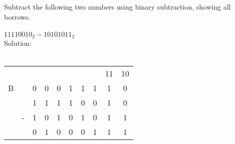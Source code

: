 Subtract the following two numbers using binary subtraction, showing all borrows. \\
\\
$11110010_2 - 10101011_2$\\

Solution: \\
\\
\begin{tabular}{cccccccccc}
    &   &   &   &   &   &   &   & 11& 10\\
  B &   & 0 & 0 & 0 & 1 & 1 & 1 & 1 & 0 \\
    &   & 1 & 1 & 1 & 1 & 0 & 0 & 1 & 0 \\
    & - & 1 & 0 & 1 & 0 & 1 & 0 & 1 & 1 \\
  \hline
    &   & 0 & 1 & 0 & 0 & 0 & 1 & 1 & 1 \\
\end{tabular} \\
